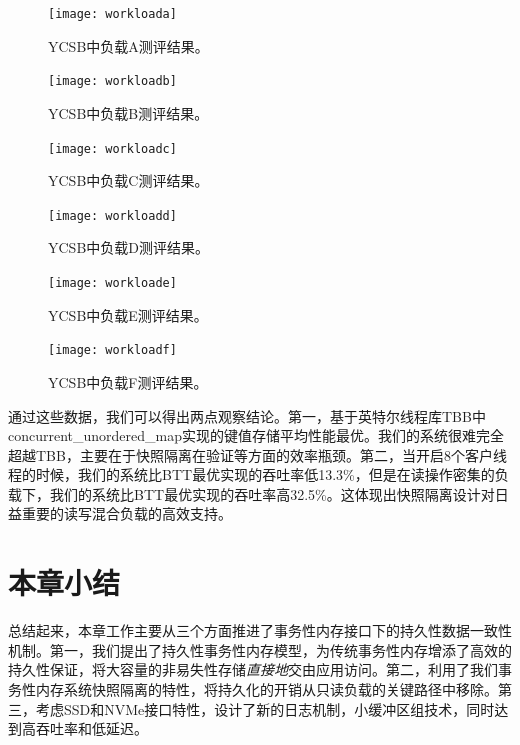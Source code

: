 \begin{figure}[!ht]
  \centering
  \texttt{[image: workloada]}
  \caption{YCSB中负载A测评结果。}
  \label{fig:workload-a}
\end{figure}

\begin{figure}[!ht]
  \centering
  \texttt{[image: workloadb]}
  \caption{YCSB中负载B测评结果。}
  \label{fig:workload-b}
\end{figure}

\begin{figure}[!ht]
  \centering
  \texttt{[image: workloadc]}
  \caption{YCSB中负载C测评结果。}
  \label{fig:workload-c}
\end{figure}

\begin{figure}[!ht]
  \centering
  \texttt{[image: workloadd]}
  \caption{YCSB中负载D测评结果。}
  \label{fig:workload-d}
\end{figure}

\begin{figure}[!ht]
  \centering
  \texttt{[image: workloade]}
  \caption{YCSB中负载E测评结果。}
  \label{fig:workload-e}
\end{figure}

\begin{figure}[!ht]
  \centering
  \texttt{[image: workloadf]}
  \caption{YCSB中负载F测评结果。}
  \label{fig:workload-f}
\end{figure}

通过这些数据，我们可以得出两点观察结论。第一，基于英特尔线程库TBB中concurrent\_unordered\_map实现的键值存储平均性能最优。我们的系统很难完全超越TBB，主要在于快照隔离在验证等方面的效率瓶颈。第二，当开启8个客户线程的时候，我们的系统比BTT最优实现的吞吐率低13.3\%，但是在读操作密集的负载下，我们的系统比BTT最优实现的吞吐率高32.5\%。这体现出快照隔离设计对日益重要的读写混合负载的高效支持。

\section{本章小结}

总结起来，本章工作主要从三个方面推进了事务性内存接口下的持久性数据一致性机制。第一，我们提出了持久性事务性内存模型，为传统事务性内存增添了高效的持久性保证，将大容量的非易失性存储\emph{直接地}交由应用访问。第二，利用了我们事务性内存系统快照隔离的特性，将持久化的开销从只读负载的关键路径中移除。第三，考虑SSD和NVMe接口特性，设计了新的日志机制，小缓冲区组技术，同时达到高吞吐率和低延迟。


